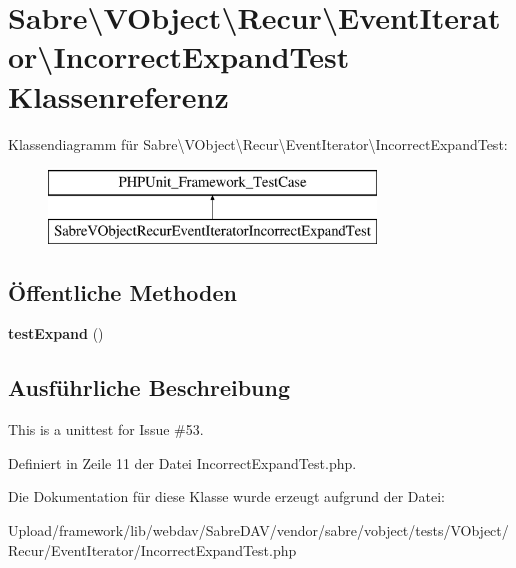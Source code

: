 \hypertarget{class_sabre_1_1_v_object_1_1_recur_1_1_event_iterator_1_1_incorrect_expand_test}{}\section{Sabre\textbackslash{}V\+Object\textbackslash{}Recur\textbackslash{}Event\+Iterator\textbackslash{}Incorrect\+Expand\+Test Klassenreferenz}
\label{class_sabre_1_1_v_object_1_1_recur_1_1_event_iterator_1_1_incorrect_expand_test}
Klassendiagramm für Sabre\textbackslash{}V\+Object\textbackslash{}Recur\textbackslash{}Event\+Iterator\textbackslash{}Incorrect\+Expand\+Test\+:\begin{figure}[H]
\begin{center}
\leavevmode
\includegraphics[height=2.000000cm]{class_sabre_1_1_v_object_1_1_recur_1_1_event_iterator_1_1_incorrect_expand_test}
\end{center}
\end{figure}
\subsection*{Öffentliche Methoden}
\begin{DoxyCompactItemize}
\item 
\mbox{\label{class_sabre_1_1_v_object_1_1_recur_1_1_event_iterator_1_1_incorrect_expand_test_a0920ef6d2e82d45e129440ca9eaa8ca6}} 
{\bfseries test\+Expand} ()
\end{DoxyCompactItemize}


\subsection{Ausführliche Beschreibung}
This is a unittest for Issue \#53. 

Definiert in Zeile 11 der Datei Incorrect\+Expand\+Test.\+php.



Die Dokumentation für diese Klasse wurde erzeugt aufgrund der Datei\+:\begin{DoxyCompactItemize}
\item 
Upload/framework/lib/webdav/\+Sabre\+D\+A\+V/vendor/sabre/vobject/tests/\+V\+Object/\+Recur/\+Event\+Iterator/Incorrect\+Expand\+Test.\+php\end{DoxyCompactItemize}
